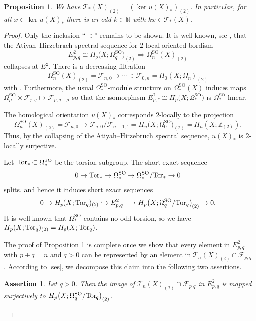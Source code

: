 \documentclass[10pt,a4paper]{amsart}
\numberwithin{equation}{section}
\newtheorem{Proposition}[Theorem]{Proposition}
\newtheorem{Assertion}[Theorem]{Assertion}
\newcommand{\Z}{\mathbb{Z}}
\newcommand{\N}{\mathbb{N}}
\newcommand{\SO}{\mathrm{SO}}
\newcommand{\Tor}{{\rm Tor}}
\begin{document}
 \begin{Proposition} \label{crucial} We have
$
 \mathscr{T}_*(X)_{(2)} = (\ker u(X)_*)_{(2)}$.
 In particular, for all $x \in \ker u(X)_*$ there is an odd $k \in \N$ with $kx \in \mathscr{T}_*(X)$.
\end{Proposition}

\begin{proof}
Only the inclusion ``$\supset$'' remains to be shown.
It is well known, see \cite[Chapter 2]{CF}, that the Atiyah--Hirzebruch spectral sequence for $2$-local oriented bordism
\[
 E^2_{p,q} \cong H_p\big(X; \Omega^{\SO}_q\big)_{(2)} \Longrightarrow \Omega^{\SO}_{n}(X)_{(2)}
 \]
collapses at $E^2$.
There is a decreasing filtration
\[
 \Omega^{\SO}_{n}(X)_{(2)} = \mathscr{F}_{n,0} \supset \cdots \supset \mathscr{F}_{0,n} = H_0(X ; \Omega_n)_{(2)}
\]
with .
Furthermore, the usual $\Omega^{\SO}_*$-module structure on $\Omega^{\SO}_*(X)$ induces maps
$
 \Omega^{\SO}_{\mu} \times \mathscr{F}_{p, q} \mapsto \mathscr{F}_{p, q+\mu}
$
so that the isomorphism $E^2_{p,*} \cong H_p\big(X; \Omega^{\SO}_*\big)$ is $\Omega^{\SO}_*$-linear.

The homological orientation $u(X)_*$ corresponds $2$-locally to the projection
\[
 \Omega^{\SO}_{n}(X)_{(2)} = \mathscr{F}_{n,0} \to \mathscr{F}_{n,0} / \mathscr{F}_{n-1,1} = H_n\big(X; \Omega^{\SO} _{0}\big)_{(2)} = H_n(X; \Z_{(2)}).
\]
Thus, by the collapsing of the Atiyah--Hirzebruch spectral sequence, $u(X)_*$ is $2$-locally surjective.

Let $\Tor_* \subset \Omega^{\SO}_*$ be the torsion subgroup.
The short exact sequence
\[
 0 \to \Tor_* \to \Omega^{\SO}_* \to \Omega^{\SO}_* / \Tor_* \to 0
\]
splits, and hence it induces short exact sequences
\begin{equation} \label{ses}
 0 \to H_p(X; \Tor_q)_{(2)} \hookrightarrow E^2_{p,q} \longrightarrow H_p\big(X; \Omega^{\SO}_q / \Tor_q\big)_{(2)} \to 0 .
\end{equation}
It is well known that $\Omega^{\SO}_*$ contains no odd torsion, so we have $H_p(X; \Tor_q)_{(2)} = H_p(X; \Tor_q)$.

The proof of Proposition \ref{crucial} is complete once we show that every element in $E^2_{p,q}$ with $p + q = n$ and $q > 0$ can be represented by an element in $\mathscr{T}_n(X)_{(2)} \cap \mathscr{F}_{p,q}$.
According to \eqref{ses}, we decompose this claim into the following two assertions.


\begin{Assertion}\label{Assertion1} Let $q > 0$.
Then the image of $\mathscr{T}_n(X)_{(2)} \cap \mathscr{F}_{p,q}$ in $E^2_{p,q}$ is mapped surjectively to $H_p\big(X; \Omega_q^{\SO} / \Tor_q \big)_{(2)}$.
\end{Assertion}



\end{proof}
\end{document}
